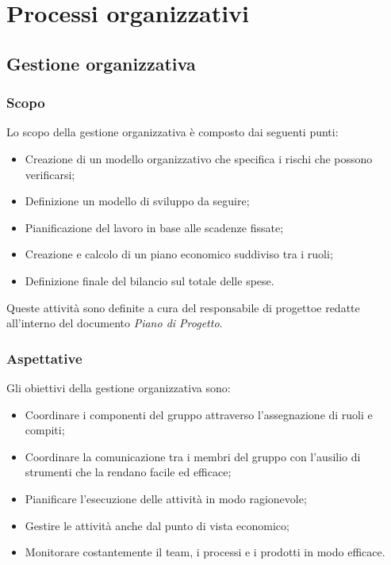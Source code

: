 %
\section{Processi organizzativi}
	\subsection{Gestione organizzativa}
		\subsubsection{Scopo}
			Lo scopo della gestione organizzativa è composto dai seguenti punti:
			\begin{itemize}
				\item Creazione di un modello organizzativo che specifica i rischi che possono verificarsi;
				\item Definizione un modello di sviluppo da seguire;
				\item Pianificazione del lavoro in base alle scadenze fissate;
				\item Creazione e calcolo di un piano economico suddiviso tra i ruoli;
				\item Definizione finale del bilancio sul totale delle spese.
			\end{itemize}
			Queste attività sono definite a cura del responsabile di progetto\glosp e redatte all'interno del documento \textit{Piano di Progetto}.
		\subsubsection{Aspettative}
			Gli obiettivi della gestione organizzativa sono:
			\begin{itemize}
				\item Coordinare i componenti del gruppo attraverso l'assegnazione di ruoli e compiti;
				\item Coordinare la comunicazione tra i membri del gruppo con l'ausilio di strumenti che la rendano facile ed efficace;
				\item Pianificare l'esecuzione delle attività in modo ragionevole;
				\item Gestire le attività anche dal punto di vista economico;
				\item Monitorare costantemente il team, i processi e i prodotti in modo efficace.
			\end{itemize}
